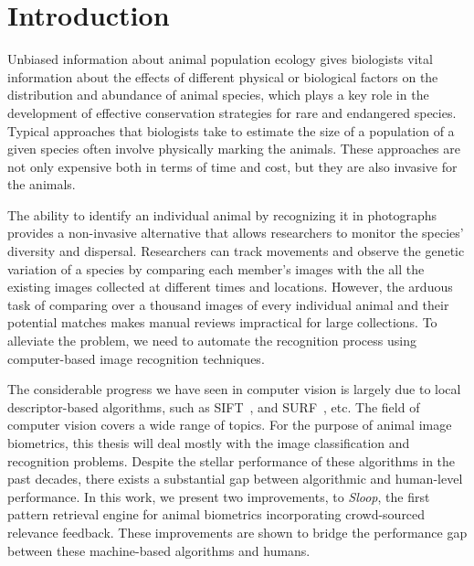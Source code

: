 
\chapter{Introduction}

Unbiased information about animal population ecology gives biologists vital
information about the effects of different physical or biological factors on
the distribution and abundance of animal species, which plays a key role in the
development of effective conservation strategies for rare and endangered
species. Typical approaches that biologists take to estimate the size of a
population of a given species often involve physically marking the animals.
These approaches are not only expensive both in terms of time and cost, but
they are also invasive for the animals.

The ability to identify an individual animal by recognizing it in photographs
provides a non-invasive alternative that allows researchers to monitor the
species' diversity and dispersal.  Researchers can track movements and observe
the genetic variation of a species by comparing each member's images with the
all the existing images collected at different times and locations. However,
the arduous task of comparing over a thousand images of every individual animal
and their potential matches makes manual reviews impractical for large
collections. To alleviate the problem, we need to automate the recognition
process using computer-based image recognition techniques.

The considerable progress we have seen in computer vision is largely due to
local descriptor-based algorithms, such as SIFT~\cite{lowe04}, and
SURF~\cite{surf08}, etc. The field of computer vision covers a wide range of
topics. For the purpose of animal image biometrics, this thesis will deal
mostly with the image classification and recognition problems. Despite the
stellar performance of these algorithms in the past decades, there exists a
substantial gap between algorithmic and human-level performance. In this work,
we present two improvements, to \emph{Sloop}, the first pattern retrieval
engine for animal biometrics incorporating crowd-sourced relevance feedback.
These improvements are shown to bridge the performance gap between these
machine-based algorithms and humans.

